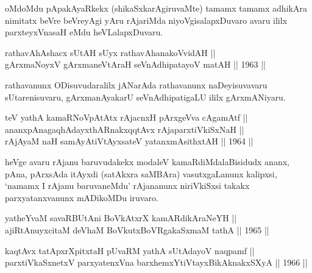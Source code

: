 \begin{artha}
oMdoMdu pApakAyaRkekx (shikaSxkarAgiruvaMte) tamamx tamamx adhikAra
nimitatx beVre beVreyAgi yAru rAjariMda niyoVgisalapxDuvaro avaru
ililx parxteyxVnasaH eMdu heVLalapxDuvaru.
\end{artha}


\begin{shl}
rathavAhAshacx sUtAH sUyx rathavAhanakoVvidAH || \\
gArxmaNoyxV gArxmaneVtAraH seVnAdhipatayoV matAH \hfill || 1963 ||
  
\end{shl}

\begin{artha}
rathavanunx ODisuvudaralilx jANarAda rathavanunx naDeyisuvavaru
sUtarenisuvaru, gArxmanAyakarU seVnAdhipatigaLU ililx gArxmANiyaru.
\end{artha}

\begin{shl}
teV yathA kamaRNoVpAtAtx rAjacnxH pArxgeVva cA\s \s gamAtf || \\
ananxpAnagaqhAdayxthARnakxqqtAvx rAjaparxtiVkiSxNaH || \\
rAjA\s yaM naH samAyAtiVtAyxsateV yatanxmAsithxtAH \hfill || 1964 ||
 
\end{shl} 

\begin{artha}
heVge avaru rAjanu baruvudakekx modaleV kamaRdiMdalaBisidudx ananx, pAna,
pArxsAda itAyxdi (satAkxra saMBAra) vasutxgaLanunx kalipxsi, `namamx I
rAjanu baruvaneMdu' rAjananunx niriVkiSxsi takakx parxyatanxvanunx
mADikoMDu iruvaro.
\end{artha}


\begin{shl}
yatheYvaM \footnotemark[1]savaRBUtAni BoVkAtxrX kamARdikAraNeYH || \\
ajiRtAnuyxcitaM deVhaM BoVkutxBoVRgakaSxmaM tathA \hfill || 1965 ||
  
\end{shl}

\begin{shl}
kaqtAvx tatApxrXpitxtaH pUvaRM yathA sUtAdayoV naqpamf || \\
parxtiVkaSxnetxV parxyatenxVna barxhemxYtiVtayxBikAknakxSXyA \hfill || 1966 ||
  
\end{shl}

